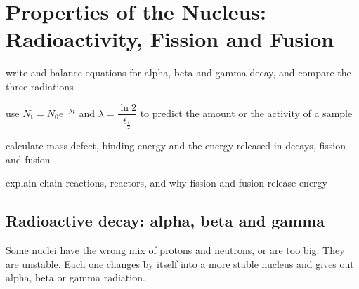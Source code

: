%
\newcommand\chFourNuc[3]{\ensuremath{\mathord{%
  \setbox0=\hbox{$\scriptstyle#1$}\setbox2=\hbox{$\scriptstyle#2$}%
  \ifdim\wd0<\wd2 \setbox0=\hbox to\wd2{\hss\box0}\else\setbox2=\hbox to\wd0{\hss\box2}\fi
  {}^{\box0}_{\box2}\mathrm{#3}}}}
\newcommand\chFourAlpha{\chFourNuc{4}{2}{He}}
\newcommand\chFourBeta{\chFourNuc{0}{-1}{e}}
\newcommand\chFourPos{\chFourNuc{0}{+1}{e}}
\newcommand\chFourNeut{\chFourNuc{1}{0}{n}}
\newcommand\chFourGam{\ensuremath{{}^{0}_{0}\gamma}}
\newcommand\chFourAnu{\ensuremath{\overline{\nu}_\mathrm{e}}}%
\newcommand\chFourNu{\ensuremath{\nu_\mathrm{e}}}

\chapter[Properties of the Nucleus]{Properties of the Nucleus: Radioactivity, Fission and Fusion}\label{ch4:chap}


\begin{goals}
  \item write and balance equations for alpha, beta and gamma decay, and compare the
        three radiations
  \item use $N_\mathrm{t} = N_0 e^{-\lambda t}$ and $\lambda = \dfrac{\ln 2}{t_{\frac{1}{2}}}$
        to predict the amount or the activity of a sample
  \item calculate mass defect, binding energy and the energy released in decays,
        fission and fusion
  \item explain chain reactions, reactors, and why fission and fusion release energy
\end{goals}

\section{Radioactive decay: alpha, beta and gamma}\label{ch4:sec:decay}

\begin{bigidea}
Some nuclei have the wrong mix of protons and neutrons, or are too big. They are
unstable. Each one changes by itself into a more stable nucleus and gives out
alpha, beta or gamma radiation.
\end{bigidea}

